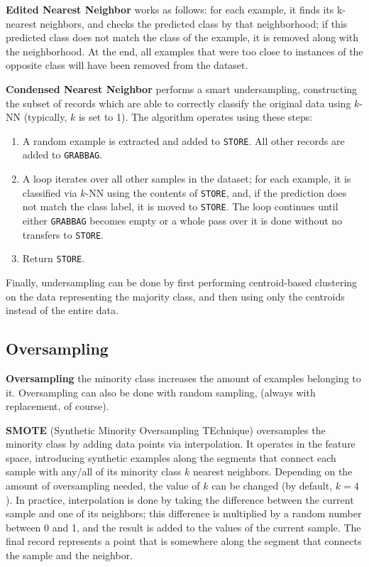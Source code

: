 \textbf{Edited Nearest Neighbor} works as follows: for each example, it finds its k-nearest neighbors, and checks the predicted class by that neighborhood; if this predicted class does not match the class of the example, it is removed along with the neighborhood. At the end, all examples that were too close to instances of the opposite class will have been removed from the dataset.

\textbf{Condensed Nearest Neighbor} performs a smart undersampling, constructing the subset of records which are able to correctly classify the original data using $k$-NN (typically, $k$ is set to 1). The algorithm operates using these steps:
\begin{enumerate}
    \item A random example is extracted and added to \texttt{STORE}. All other records are added to \texttt{GRABBAG}.
    \item A loop iterates over all other samples in the dataset; for each example, it is classified via $k$-NN using the contents of \texttt{STORE}, and, if the prediction does not match the class label, it is moved to \texttt{STORE}. The loop continues until either \texttt{GRABBAG} becomes empty or a whole pass over it is done without no transfers to \texttt{STORE}.
    \item Return \texttt{STORE}.
\end{enumerate}

Finally, undersampling can be done by first performing centroid-based clustering on the data representing the majority class, and then using only the centroids instead of the entire data.

\subsection{Oversampling}

\textbf{Oversampling} the minority class increases the amount of examples belonging to it. Oversampling can also be done with random sampling, (always with replacement, of course).

\textbf{SMOTE} (Synthetic Minority Oversampling TEchnique) oversamples the minority class by adding data points via interpolation. It operates in the feature space, introducing synthetic examples along the segments that connect each sample with any/all of its minority class $k$ nearest neighbors. Depending on the amount of oversampling needed, the value of $k$ can be changed (by default, $k=4$). In practice, interpolation is done by taking the difference between the current sample and one of its neighbors; this difference is multiplied by a random number between 0 and 1, and the result is added to the values of the current sample. The final record represents a point that is somewhere along the segment that connects the sample and the neighbor.

